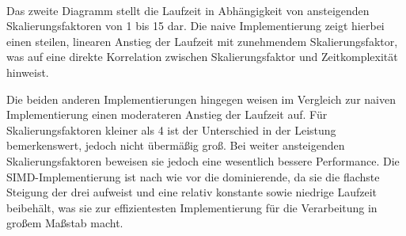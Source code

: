 \documentclass[course=erap]{aspdoc}
\begin{document}
 \\

Das zweite Diagramm stellt die Laufzeit in Abhängigkeit von ansteigenden Skalierungsfaktoren von 1 bis 15 dar. Die naive Implementierung zeigt hierbei einen steilen, linearen Anstieg der Laufzeit mit zunehmendem Skalierungsfaktor, was auf eine direkte Korrelation zwischen Skalierungsfaktor und Zeitkomplexität hinweist.

Die beiden anderen Implementierungen hingegen weisen im Vergleich zur naiven Implementierung einen moderateren Anstieg der Laufzeit auf. Für Skalierungsfaktoren kleiner als 4 ist der Unterschied in der Leistung bemerkenswert, jedoch nicht übermäßig groß. Bei weiter ansteigenden Skalierungsfaktoren beweisen sie jedoch eine wesentlich bessere Performance. Die SIMD-Implementierung ist nach wie vor die dominierende, da sie die flachste Steigung der drei aufweist und eine relativ konstante sowie niedrige Laufzeit beibehält, was sie zur effizientesten Implementierung für die Verarbeitung in großem Maßstab macht.
\end{document}
